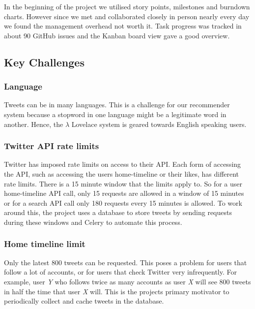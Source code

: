 \documentclass{article}
\begin{document}
In the beginning of the project we utilised story points, milestones and burndown charts. However since we met and collaborated closely in person nearly every day we found the management overhead not worth it. Task progress was tracked in about 90 GitHub issues and the Kanban board view gave a good overview.

\subsection{Key Challenges} 

\subsubsection*{Language} 
Tweets can be in many languages. This is a challenge for our recommender system because a stopword in one language might be a legitimate word in another. Hence, the $\lambda$ Lovelace system is geared towards English speaking users.




\subsubsection*{Twitter API rate limits} 

Twitter has imposed rate limits on access to their API. Each form of accessing the API, such as accessing the users home-timeline or their likes, has different rate limits. There is a 15 minute window that the limits apply to. So for a user home-timeline API call, only 15 requests are allowed in a window of 15 minutes or for a search API call only 180 requests every 15 minutes is allowed. To work around this, the project uses a database to store tweets by sending requests during these windows and Celery to automate this process.
    
\subsubsection*{Home timeline limit} 

Only the latest 800 tweets can be requested. This poses a problem for users that follow a lot of accounts, or for users that check Twitter very infrequently. For example, user \textit{Y} who follows twice as many accounts as user \textit{X} will see 800 tweets in half the time that user \textit{X} will. This is the projects primary motivator to periodically collect and cache tweets in the database.
\end{document}

